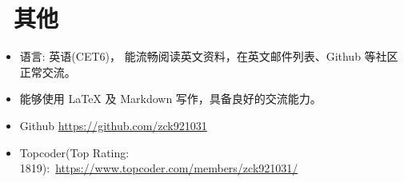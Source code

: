 \documentclass{resume}
\begin{document}
\section{\faInfo\ 其他}
\begin{itemize}[parsep=0.5ex]
  \item 语言: 英语(CET6)， 能流畅阅读英文资料，在英文邮件列表、Github 等社区正常交流。
  \item 能够使用 LaTeX 及 Markdown 写作，具备良好的交流能力。
  \item \faGithub Github \href{https://github.com/zck921031}{https://github.com/zck921031}
  \item Topcoder(Top Rating: 1819):\  \href{https://www.topcoder.com/members/zck921031/}{https://www.topcoder.com/members/zck921031/}
\end{itemize}

%
%
\end{document}

